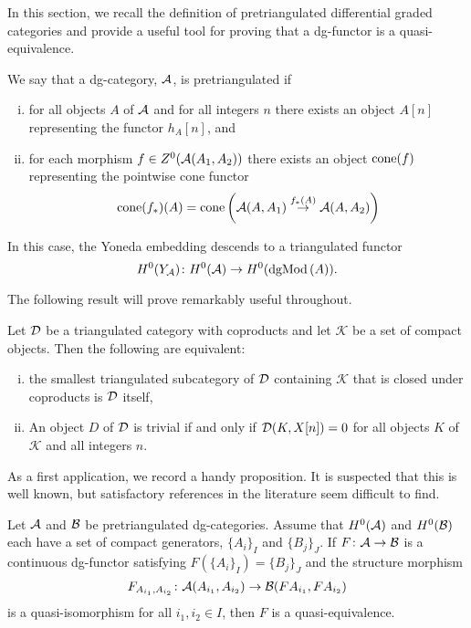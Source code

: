 In this section, we recall the definition of pretriangulated differential graded categories and provide a useful tool for proving that a dg-functor is a quasi-equivalence.

\begin{definition}
  We say that a dg-category, \(\mathcal{A}\), is pretriangulated if
  \begin{enumerate}[(i)]
  \item
    for all objects \(A\) of \(\mathcal{A}\) and for all integers \(n\) there exists an object \(A[n]\) representing the functor \(h_A[n]\), and
  \item
    for each morphism \(f \in Z^0(\mathcal{A}(A_1, A_2))\) there exists an object \(\operatorname{cone}(f)\) representing the pointwise cone functor
    \[\operatorname{cone}(f_\ast)(A) = \operatorname{cone}\left(\mathcal{A}(A,A_1) \overset{f_\ast(A)}\to \mathcal{A}(A,A_2)\right)\]
  \end{enumerate}
  In this case, the Yoneda embedding descends to a triangulated functor
  \[H^0(Y_{\mathcal{A}}) \colon H^0(\mathcal{A}) \to H^0(\operatorname{dgMod}\left(A\right)).\]
\end{definition}

The following result will prove remarkably useful throughout.
\begin{lemma}
  Let \(\mathcal{D}\) be a triangulated category with coproducts and let \(\mathcal{K}\) be a set of compact objects.
  Then the following are equivalent:
  \begin{enumerate}[(i)]
  \item
    the smallest triangulated subcategory of \(\mathcal{D}\) containing \(\mathcal{K}\) that is closed under coproducts is \(\mathcal{D}\) itself,
  \item
    An object \(D\) of \(\mathcal{D}\) is trivial if and only if \(\mathcal{D}(K, X[n]) = 0\) for all objects \(K\) of \(\mathcal{K}\) and all integers \(n\).
  \end{enumerate}
\end{lemma}

As a first application, we record a handy proposition.  It is suspected that this is well known, but satisfactory references in the literature seem difficult to find.

\begin{proposition} \label{proposition: quasi-equivalence on gens is quasi-equivalence}
  Let \(\mathcal{A}\) and \(\mathcal{B}\) be pretriangulated dg-categories.
  Assume that \(H^0(\mathcal{A})\) and \(H^0(\mathcal{B})\) each have a set of compact generators, \(\{A_i\}_I\) and \(\{B_j\}_J\).
  If \(F \colon \mathcal{A} \to \mathcal{B}\) is a continuous dg-functor satisfying \(F(\{A_i\}_I) = \{B_j\}_J\) and the structure morphism
  \[F_{A_{i_1}, A_{i_2}} \colon \mathcal{A}(A_{i_1}, A_{i_2}) \to \mathcal{B}(FA_{i_1}, FA_{i_2})\]
  is a quasi-isomorphism for all \(i_1, i_2 \in I\), then \(F\) is a quasi-equivalence.
\end{proposition}

